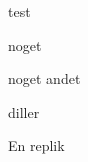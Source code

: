 \begin{Sang}[noget]{test}
	
	\begin{Lydeffekter}
		\item noget
		\item noget andet
	\end{Lydeffekter}
	
	\begin{Regi}
		diller 
	\end{Regi}
	
	\begin{Replik}[B]
		 En replik
	\end{Replik}	
	
\end{Sang}

